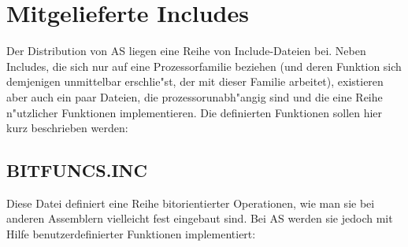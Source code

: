 \documentclass[12pt,a4paper,twoside]{report}
\begin{document}
{%

\cleardoublepage
\chapter{Mitgelieferte Includes}

Der Distribution von AS liegen eine Reihe von Include-Dateien bei.  Neben
Includes, die sich nur auf eine Prozessorfamilie beziehen (und deren
Funktion sich demjenigen unmittelbar erschlie"st, der mit dieser Familie
arbeitet), existieren aber auch ein paar Dateien, die prozessorunabh"angig
sind und die eine Reihe n"utzlicher Funktionen implementieren.  Die
definierten Funktionen sollen hier kurz beschrieben werden:

\section{BITFUNCS.INC}

Diese Datei definiert eine Reihe bitorientierter Operationen, wie man sie
bei anderen Assemblern vielleicht fest eingebaut sind.  Bei AS werden sie
jedoch mit Hilfe benutzerdefinierter Funktionen implementiert:

}
\end{document}
